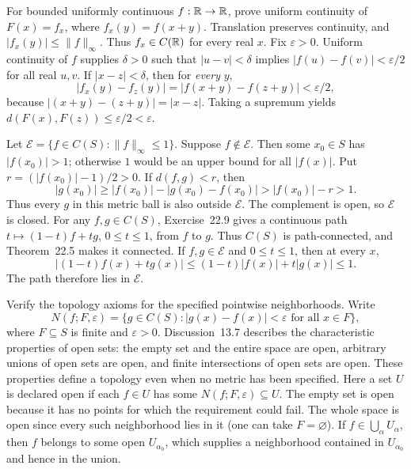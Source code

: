 \goal For bounded uniformly continuous $f:\mathbb{R}\to\mathbb{R}$, prove uniform
continuity of $F(x)=f_x$, where $f_x(y)=f(x+y)$.
Translation preserves continuity, and $|f_x(y)|\le\|f\|_\infty$.
Thus $f_x\in C(\mathbb{R})$ for every real $x$.
Fix $\varepsilon>0$. Uniform continuity of $f$ supplies $\delta>0$
such that $|u-v|<\delta$ implies
$|f(u)-f(v)|<\varepsilon/2$ for all real $u,v$. If $|x-z|<\delta$,
then for \emph{every} $y$,
\[
 |f_x(y)-f_z(y)|=|f(x+y)-f(z+y)|<\varepsilon/2,
\]
because $|(x+y)-(z+y)|=|x-z|$. Taking a supremum yields
$d(F(x),F(z))\le\varepsilon/2<\varepsilon$.

\goal Let $\mathcal E=\{f\in C(S):\|f\|_\infty\le1\}$.
Suppose $f\notin\mathcal E$. Then some $x_0\in S$ has $|f(x_0)|>1$;
otherwise $1$ would be an upper bound for all $|f(x)|$. Put
$r=(|f(x_0)|-1)/2>0$. If $d(f,g)<r$, then
\[
 |g(x_0)|\ge|f(x_0)|-|g(x_0)-f(x_0)|
 >|f(x_0)|-r>1.
\]
Thus every $g$ in this metric ball is also outside $\mathcal E$.
The complement is open, so $\mathcal E$ is closed.
For any $f,g\in C(S)$, Exercise~22.9 gives a continuous path
$t\mapsto(1-t)f+tg$, $0\le t\le1$, from $f$ to $g$. Thus $C(S)$
is path-connected, and Theorem~22.5 makes it connected.
If $f,g\in\mathcal E$ and $0\le t\le1$, then at every $x$,
\[
 |(1-t)f(x)+tg(x)|\le(1-t)|f(x)|+t|g(x)|\le1.
\]
The path therefore lies in $\mathcal E$.

\goal Verify the topology axioms for the specified pointwise neighborhoods.
Write
\[
 N(f;F,\varepsilon)=\{g\in C(S):
               |g(x)-f(x)|<\varepsilon\text{ for all }x\in F\},
\]
where $F\subseteq S$ is finite and $\varepsilon>0$.
Discussion~13.7 describes the characteristic properties of open sets:
the empty set and the entire space are open, arbitrary unions of open
sets are open, and finite intersections of open sets are open. These
properties define a topology even when no metric has been specified.
Here a set $U$ is declared open if each $f\in U$ has some
$N(f;F,\varepsilon)\subseteq U$.
The empty set is open because it has no points for which the requirement
could fail. The whole space is open since every such neighborhood lies
in it (one can take $F=\varnothing$). If $f\in\bigcup_\alpha U_\alpha$,
then $f$ belongs to some open $U_{\alpha_0}$, which supplies a
neighborhood contained in $U_{\alpha_0}$ and hence in the union.

